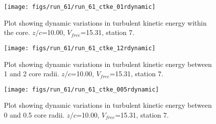 \begin{figure}[H]
\centering
\texttt{[image: figs/run\_61/run\_61\_ctke\_01rdynamic]}
\caption{Plot showing dynamic variations in turbulent kinetic energy within the core. $z/c$=10.00, $V_{free}$=15.31, station 7.}
\end{figure}


\begin{figure}[H]
\centering
\texttt{[image: figs/run\_61/run\_61\_ctke\_12rdynamic]}
\caption{Plot showing dynamic variations in turbulent kinetic energy between 1 and 2 core radii. $z/c$=10.00, $V_{free}$=15.31, station 7.}
\end{figure}


\begin{figure}[H]
\centering
\texttt{[image: figs/run\_61/run\_61\_ctke\_005rdynamic]}
\caption{Plot showing dynamic variations in turbulent kinetic energy between 0 and 0.5 core radii. $z/c$=10.00, $V_{free}$=15.31, station 7.}
\end{figure}


